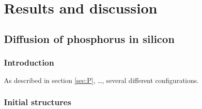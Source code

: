 \documentclass[11pt,bibliography=totoc,index=totoc]{scrbook}   %
\begin{document}




\part{Results and discussion}

\chapter{Diffusion of phosphorus in silicon}

\section{Introduction}\label{sec:resultsIntro}

As described in section \ref{sec:P}, \ldots, several different configurations.


\section{Initial structures}\label{sec:structures}


\end{document}
